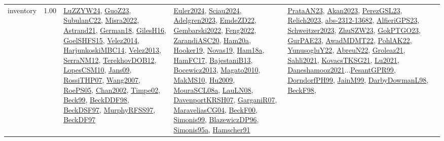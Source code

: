 {\begin{longtable}{p{3cm}r>{\raggedright\arraybackslash}p{6cm}>{\raggedright\arraybackslash}p{6cm}>{\raggedright\arraybackslash}p{8cm}}
\index{inventory}\index{Concepts!inventory}inventory &  1.00 & \hyperref[detail:LuZZYW24]{LuZZYW24}, \hyperref[detail:GuoZ23]{GuoZ23}, \hyperref[detail:SubulanC22]{SubulanC22}, \hyperref[detail:Misra2022]{Misra2022}, \hyperref[detail:Astrand21]{Astrand21}, \hyperref[detail:German18]{German18}, \hyperref[detail:GilesH16]{GilesH16}, \hyperref[detail:GoelSHFS15]{GoelSHFS15}, \hyperref[detail:Velez2014]{Velez2014}, \hyperref[detail:HarjunkoskiMBC14]{HarjunkoskiMBC14}, \hyperref[detail:Velez2013]{Velez2013}, \hyperref[detail:SerraNM12]{SerraNM12}, \hyperref[detail:TerekhovDOB12]{TerekhovDOB12}, \hyperref[detail:LopesCSM10]{LopesCSM10}, \hyperref[detail:Jans09]{Jans09}, \hyperref[detail:RossiTHP07]{RossiTHP07}, \hyperref[detail:Wang2007]{Wang2007}, \hyperref[detail:RoePS05]{RoePS05}, \hyperref[detail:Chan2002]{Chan2002}, \hyperref[detail:Timpe02]{Timpe02}, \hyperref[detail:Beck99]{Beck99}, \hyperref[detail:BeckDDF98]{BeckDDF98}, \hyperref[detail:BeckDSF97]{BeckDSF97}, \hyperref[detail:MurphyRFSS97]{MurphyRFSS97}, \hyperref[detail:BeckDF97]{BeckDF97} & \hyperref[detail:Euler2024]{Euler2024}, \hyperref[detail:Sciau2024]{Sciau2024}, \hyperref[detail:Adelgren2023]{Adelgren2023}, \hyperref[detail:EmdeZD22]{EmdeZD22}, \hyperref[detail:Gembarski2022]{Gembarski2022}, \hyperref[detail:Feng2022]{Feng2022}, \hyperref[detail:ZarandiASC20]{ZarandiASC20}, \hyperref[detail:Ham20a]{Ham20a}, \hyperref[detail:Hooker19]{Hooker19}, \hyperref[detail:Novas19]{Novas19}, \hyperref[detail:Ham18a]{Ham18a}, \hyperref[detail:HamFC17]{HamFC17}, \hyperref[detail:BajestaniB13]{BajestaniB13}, \hyperref[detail:Bocewicz2013]{Bocewicz2013}, \hyperref[detail:Magato2010]{Magato2010}, \hyperref[detail:MakMS10]{MakMS10}, \hyperref[detail:Hu2009]{Hu2009}, \hyperref[detail:MouraSCL08a]{MouraSCL08a}, \hyperref[detail:LauLN08]{LauLN08}, \hyperref[detail:DavenportKRSH07]{DavenportKRSH07}, \hyperref[detail:GarganiR07]{GarganiR07}, \hyperref[detail:MaraveliasCG04]{MaraveliasCG04}, \hyperref[detail:BeckF00]{BeckF00}, \hyperref[detail:Simonis99]{Simonis99}, \hyperref[detail:BlazewiczDP96]{BlazewiczDP96}, \hyperref[detail:Simonis95a]{Simonis95a}, \hyperref[detail:Hamscher91]{Hamscher91} & \hyperref[detail:PrataAN23]{PrataAN23}, \hyperref[detail:Akan2023]{Akan2023}, \hyperref[detail:PerezGSL23]{PerezGSL23}, \hyperref[detail:Relich2023]{Relich2023}, \hyperref[detail:abs-2312-13682]{abs-2312-13682}, \hyperref[detail:AlfieriGPS23]{AlfieriGPS23}, \hyperref[detail:Schweitzer2023]{Schweitzer2023}, \hyperref[detail:ZhuSZW23]{ZhuSZW23}, \hyperref[detail:GokPTGO23]{GokPTGO23}, \hyperref[detail:GurPAE23]{GurPAE23}, \hyperref[detail:AwadMDMT22]{AwadMDMT22}, \hyperref[detail:PohlAK22]{PohlAK22}, \hyperref[detail:YunusogluY22]{YunusogluY22}, \hyperref[detail:AbreuN22]{AbreuN22}, \hyperref[detail:Groleaz21]{Groleaz21}, \hyperref[detail:Sahli2021]{Sahli2021}, \hyperref[detail:KovacsTKSG21]{KovacsTKSG21}, \hyperref[detail:Lu2021]{Lu2021}, \hyperref[detail:Daneshamooz2021]{Daneshamooz2021}...\hyperref[detail:PesantGPR99]{PesantGPR99}, \hyperref[detail:DorndorfPH99]{DorndorfPH99}, \hyperref[detail:JainM99]{JainM99}, \hyperref[detail:DarbyDowmanL98]{DarbyDowmanL98}, \hyperref[detail:BeckF98]{BeckF98}, 
\end{longtable}}
